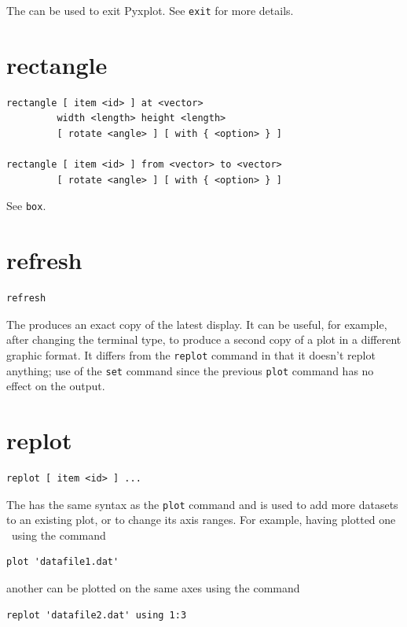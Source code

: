 The  can be used to exit Pyxplot. See {\tt exit} for more
details.


\section{rectangle}

\begin{verbatim}
rectangle [ item <id> ] at <vector>
         width <length> height <length>
         [ rotate <angle> ] [ with { <option> } ]

rectangle [ item <id> ] from <vector> to <vector>
         [ rotate <angle> ] [ with { <option> } ]
\end{verbatim}

See {\tt box}.


\section{refresh}

\begin{verbatim}
refresh
\end{verbatim}

The  produces an exact copy of the latest display. It can be
useful, for example, after changing the terminal type, to produce a second copy
of a plot in a different graphic format. It differs from the {\tt replot}
command in that it doesn't replot anything; use of the {\tt set} command since
the previous {\tt plot} command has no effect on the output.


\section{replot}

\begin{verbatim}
replot [ item <id> ] ...
\end{verbatim}

The  has the same syntax as the {\tt plot} command and is
used to add more datasets to an existing plot, or to change its axis ranges.
For example, having plotted one \datafile\ using the command

\begin{verbatim}
plot 'datafile1.dat'
\end{verbatim}

\noindent another can be plotted on the same axes using the command

\begin{verbatim}
replot 'datafile2.dat' using 1:3
\end{verbatim}

